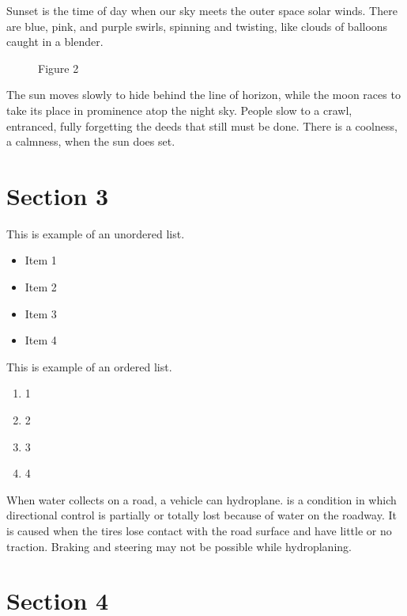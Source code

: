 Sunset is the time of day when our sky meets the outer space solar winds. There are blue, pink, and purple swirls, spinning and twisting, like clouds of balloons caught in a blender. 

\begin{figure}[]
\caption{Figure 2}
\label{fig:2}
\end{figure}

The sun moves slowly to hide behind the line of horizon, while the moon races to take its place in prominence atop the night sky. People slow to a crawl, entranced, fully forgetting the deeds that still must be done. There is a coolness, a calmness, when the sun does set.
    
\section{Section 3}
\label{section:3}

This is example of an unordered list.
\begin{itemize}
\item Item 1
\item Item 2
\item Item 3
\item Item 4
\end{itemize}

This is example of an ordered list.
\begin{enumerate}
\item 1
\item 2
\item 3
\item 4
\end{enumerate}

When water collects on a road, a vehicle can hydroplane.  is a condition in which directional control is partially or totally lost because of water on the roadway. It is caused when the tires lose contact with the road surface and have little or no traction. Braking and steering may not be possible while hydroplaning.

\section{Section 4}
\label{section:4}

